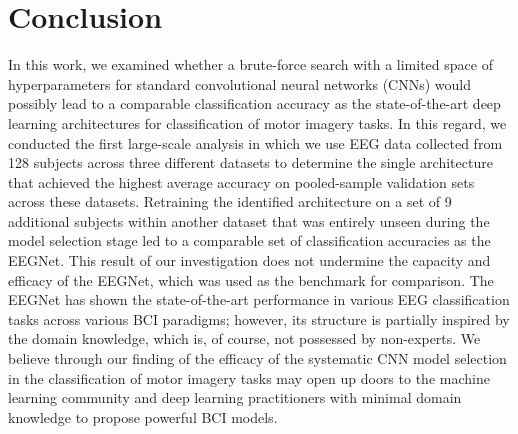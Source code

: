 \documentclass{ieeeaccess}
\begin{document}
{    
    \section{Conclusion}
    \label{sec:conclusion}
    In this work, we examined whether a brute-force search with a limited space of hyperparameters for standard convolutional neural networks (CNNs) would possibly lead to a comparable classification accuracy as the state-of-the-art deep learning architectures for classification of motor imagery tasks. In this regard, we conducted the first large-scale analysis in which we use EEG data collected from 128 subjects across three different datasets to determine the single architecture that achieved the highest average accuracy on pooled-sample validation sets across these datasets. Retraining the identified architecture on a set of 9 additional subjects within another dataset that was entirely unseen during the model selection stage led to a comparable set of classification accuracies as the EEGNet. This result of our investigation does not undermine the capacity and efficacy of the EEGNet, which was used as the benchmark for comparison. The EEGNet has shown the state-of-the-art performance in various EEG classification tasks across various BCI paradigms; however, its structure is partially inspired by the domain knowledge, which is, of course, not possessed by non-experts. We believe through our finding of the efficacy of the systematic CNN model selection in the classification of motor imagery tasks may open up doors to the machine learning community and deep learning practitioners with minimal domain knowledge to propose powerful BCI models. 
           
    
      
    
}
\end{document}
